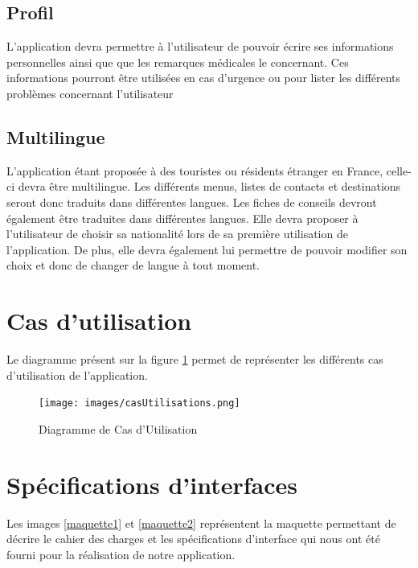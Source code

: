 \subsection{Profil}

	L'application devra permettre à l'utilisateur de pouvoir écrire ses informations personnelles ainsi que que les remarques médicales le concernant. Ces informations pourront être utilisées en cas d'urgence ou pour lister les différents problèmes concernant l'utilisateur

\subsection{Multilingue}

	L'application étant proposée à des touristes ou résidents étranger en France, celle-ci devra être multilingue. Les différents menus, listes de contacts et destinations seront donc traduits dans différentes langues. Les fiches de conseils devront également être traduites dans différentes langues. Elle devra proposer à l'utilisateur de choisir sa nationalité lors de sa première utilisation de l'application. De plus, elle devra également lui permettre de pouvoir modifier son choix et donc de changer de langue à tout moment.

\section{Cas d'utilisation}

	Le diagramme présent sur la figure \ref{casUtilisations} permet de représenter les différents cas d'utilisation de l'application.
	
\begin{figure}[!h]
	\begin{center}
	
		\texttt{[image: images/casUtilisations.png]}
	    \caption{Diagramme de Cas d'Utilisation}
	    \label{casUtilisations} 
	
	\end{center}
\end{figure}

\newpage

\section{Spécifications d'interfaces}
	Les images \ref{maquette1} et \ref{maquette2} représentent la maquette permettant de décrire le cahier des charges et les spécifications d'interface qui nous ont été fourni pour la réalisation de notre application.

